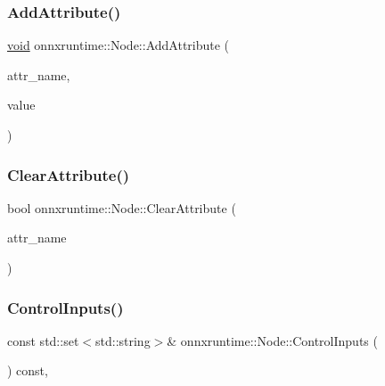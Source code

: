 \subsubsection{\texorpdfstring{Add\+Attribute()}{AddAttribute()}}
{\footnotesize\ttfamily \mbox{\hyperlink{mlasi_8h_a88f941d423cb2a819b70a1358982b1a6}{void}} onnxruntime\+::\+Node\+::\+Add\+Attribute (\begin{DoxyParamCaption}\item[{const std\+::string \&}]{attr\+\_\+name,  }\item[{const O\+N\+N\+X\+\_\+\+N\+A\+M\+E\+S\+P\+A\+C\+E\+::\+Attribute\+Proto \&}]{value }\end{DoxyParamCaption})}

\mbox{\label{classonnxruntime_1_1Node_aef841ccf82587a2eb4170aa52917e27b}} 
\subsubsection{\texorpdfstring{Clear\+Attribute()}{ClearAttribute()}}
{\footnotesize\ttfamily bool onnxruntime\+::\+Node\+::\+Clear\+Attribute (\begin{DoxyParamCaption}\item[{const std\+::string \&}]{attr\+\_\+name }\end{DoxyParamCaption})}

\mbox{\label{classonnxruntime_1_1Node_a0474e6c8bbef04b6de22f439378884d2}} 
\subsubsection{\texorpdfstring{Control\+Inputs()}{ControlInputs()}}
{\footnotesize\ttfamily const std\+::set$<$std\+::string$>$\& onnxruntime\+::\+Node\+::\+Control\+Inputs (\begin{DoxyParamCaption}{ }\end{DoxyParamCaption}) const\hspace{0.3cm}{\ttfamily [inline]}, {\ttfamily [noexcept]}}

\mbox{\label{classonnxruntime_1_1Node_a9aebff1cb689800a30910cf2fe74df32}} 
